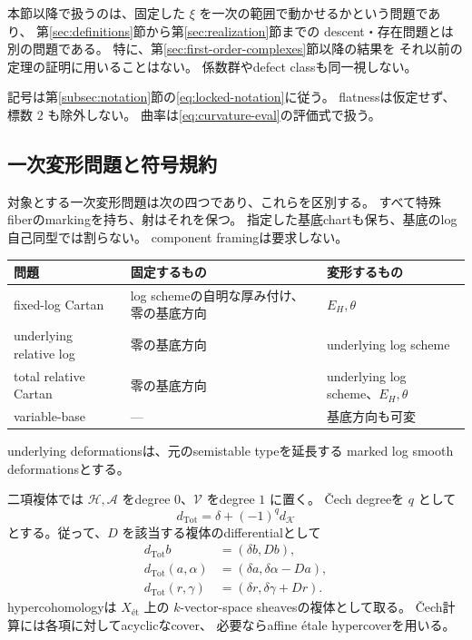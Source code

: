\documentclass[uplatex,dvipdfmx,11pt]{jsarticle}
\numberwithin{equation}{section}
\theoremstyle{plain}
\theoremstyle{definition}
\theoremstyle{remark}
\newcommand{\shH}{\mathcal H}
\newcommand{\shA}{\mathcal A}
\newcommand{\shV}{\mathcal V}
\begin{document}
本節以降で扱うのは、固定した \(\xi\) を一次の範囲で動かせるかという問題であり、
第\ref{sec:definitions}節から第\ref{sec:realization}節までの
descent・存在問題とは別の問題である。
特に、第\ref{sec:first-order-complexes}節以降の結果を
それ以前の定理の証明に用いることはない。
係数群やdefect classも同一視しない。

記号は第\ref{subsec:notation}節の\eqref{eq:locked-notation}に従う。
flatnessは仮定せず、標数 \(2\) も除外しない。
曲率は\eqref{eq:curvature-eval}の評価式で扱う。

\subsection{一次変形問題と符号規約}

対象とする一次変形問題は次の四つであり、これらを区別する。
すべて特殊fiberのmarkingを持ち、射はそれを保つ。
指定した基底chartも保ち、基底のlog自己同型では割らない。
component framingは要求しない。

\begin{center}
\begin{tabular}{@{}p{}p{}p{}@{}}
\hline
問題 & 固定するもの & 変形するもの\\
\hline
fixed-log Cartan & log schemeの自明な厚み付け、零の基底方向 & \(E_H,\theta\)\\
underlying relative log & 零の基底方向 & underlying log scheme\\
total relative Cartan & 零の基底方向 & underlying log scheme、\(E_H,\theta\)\\
variable-base & --- & 基底方向も可変\\
\hline
\end{tabular}
\end{center}

underlying deformationsは、元のsemistable typeを延長する
marked log smooth deformationsとする。

二項複体では \(\shH,\shA\) をdegree \(0\)、\(\shV\) をdegree \(1\) に置く。
Čech degreeを \(q\) として
\[
d_{\mathrm{Tot}}=\delta+(-1)^q d_{\mathcal K}
\]
とする。従って、\(D\) を該当する複体のdifferentialとして
\begin{equation}
\label{eq:total-differential}
\begin{aligned}
d_{\mathrm{Tot}}b&=(\delta b,Db),\\
d_{\mathrm{Tot}}(a,\alpha)&=(\delta a,\delta\alpha-Da),\\
d_{\mathrm{Tot}}(r,\gamma)&=(\delta r,\delta\gamma+Dr).
\end{aligned}
\end{equation}
hypercohomologyは \(X_{\text{\'et}}\) 上の
\(k\)-vector-space sheavesの複体として取る。
Čech計算には各項に対してacyclicなcover、
必要ならaffine étale hypercoverを用いる。
\end{document}
